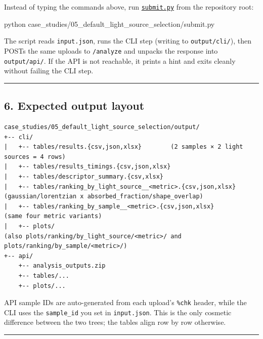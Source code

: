 \documentclass[
  11pt,
]{article}
\newenvironment{Shaded}{}{}
\newcommand{\ExtensionTok}[1]{#1}
\newcommand{\NormalTok}[1]{#1}
\begin{document}
Instead of typing the commands above, run
\href{https://github.com/pinarsyt/overlap-calculator/blob/main/case_studies/05_default_light_source_selection/submit.py}{\texttt{submit.py}}
from the repository root:

\begin{Shaded}
\begin{Highlighting}[]
\ExtensionTok{python}\NormalTok{ case\_studies/05\_default\_light\_source\_selection/submit.py}
\end{Highlighting}
\end{Shaded}

The script reads \texttt{input.json}, runs the CLI step (writing to
\texttt{output/cli/}), then POSTs the same uploads to \texttt{/analyze}
and unpacks the response into \texttt{output/api/}. If the API is not
reachable, it prints a hint and exits cleanly without failing the CLI
step.

\begin{center}\rule{0.5\linewidth}{0.5pt}\end{center}

\hypertarget{6-expected-output-layout}{
\subsection{6. Expected output layout}\label{6-expected-output-layout}}

\begin{verbatim}
case_studies/05_default_light_source_selection/output/
+-- cli/
|   +-- tables/results.{csv,json,xlsx}        (2 samples × 2 light sources = 4 rows)
|   +-- tables/results_timings.{csv,json,xlsx}
|   +-- tables/descriptor_summary.{csv,xlsx}
|   +-- tables/ranking_by_light_source__<metric>.{csv,json,xlsx}   (gaussian/lorentzian x absorbed_fraction/shape_overlap)
|   +-- tables/ranking_by_sample__<metric>.{csv,json,xlsx}          (same four metric variants)
|   +-- plots/                                                      (also plots/ranking/by_light_source/<metric>/ and plots/ranking/by_sample/<metric>/)
+-- api/
    +-- analysis_outputs.zip
    +-- tables/...
    +-- plots/...
\end{verbatim}

API sample IDs are auto-generated from each upload's \texttt{\%chk}
header, while the CLI uses the \texttt{sample\_id} you set in
\texttt{input.json}. This is the only cosmetic difference between the
two trees; the tables align row by row otherwise.

\begin{center}\rule{0.5\linewidth}{0.5pt}\end{center}
\end{document}
